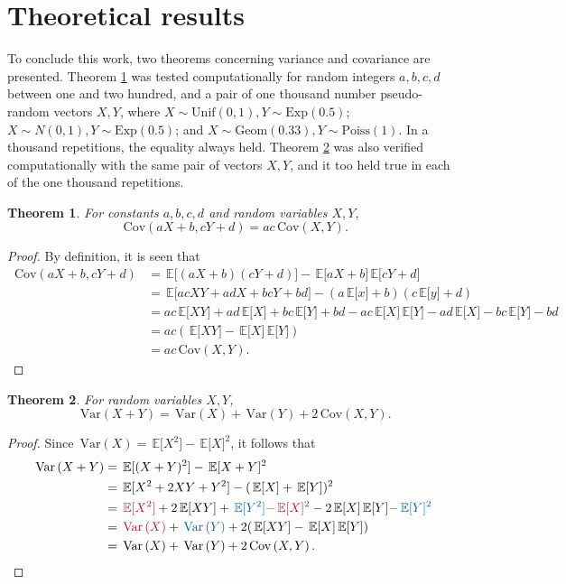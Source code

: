 \documentclass[letterpaper, 10 pt, conference]{article}
\newtheorem{thm}{Theorem}
\newcommand\var[1]{\, \mathrm{Var} \left( #1 \right)}
\newcommand\cov[1]{\, \mathrm{Cov} \left( #1 \right)}
\newcommand\expec[1]{\, \mathbb{E} \lbrack #1 \rbrack}
\begin{document}
\section{Theoretical results}
To conclude this work, two theorems concerning variance and covariance are presented. Theorem \ref{thm:cov} was tested computationally for random integers $a, b, c, d$ between one and two hundred, and a pair of one thousand number pseudo-random vectors $X, Y$, where  $X \sim \mathrm{Unif}(0,1), Y \sim \mathrm{Exp}(0.5)$; $X \sim N(0,1), Y \sim \mathrm{Exp}(0.5)$; and $X \sim \mathrm{Geom}(0.33), Y \sim \mathrm{Poiss}(1)$. In a thousand repetitions, the equality always held. Theorem \ref{thm:var} was also verified computationally with the same pair of vectors $X, Y$, and it too held true in each of the one thousand repetitions.

\begin{thm} \label{thm:cov}
	For constants $a, b, c, d$ and random variables $X, Y,$
	\begin{equation}
		\cov{a X + b, c Y + d} = a c  \cov{X, Y}.
	\end{equation}
\end{thm}
\begin{proof}
	By definition, it is seen that
	\begin{align}
		\cov{a X + b, c Y + d} &= \expec{(aX+b)(cY+d)} - \expec{a X + b} \expec{c Y + d}\\
		&= \expec{ac XY + ad   X + bc   Y + bd} - (a \expec{x} + b)(c \expec{y} + d)\\
		&= ac   \expec{XY} + ad   \expec{X} + bc    \expec{Y} + bd - ac   \expec{X} \expec{Y} - ad   \expec{X} - bc   \expec{Y} - bd\\
		&= ac(\expec{XY} - \expec{X} \expec{Y})\\
		&= ac   \cov{X, Y}.
	\end{align}
\end{proof}

\begin{thm}\label{thm:var}
	For random variables $X, Y$, 
	\begin{equation}
		\var{X+Y} = \var{X} + \var{Y} + 2   \cov{X, Y}.
	\end{equation}
\end{thm}
\begin{proof}
	Since $\var{X} = \expec{X^2} - \expec{X}^2$, it follows that
	\begin{align}
		\var{X+Y} &= \expec{(X+Y)^2} - \expec{X+Y}^2 \\
		&= \expec{X^2 + 2 X Y + Y^2} - (\expec{X} + \expec{Y} )^2 \\
		&= \textcolor{Maroon}{\expec{X^2}} + 2 \expec{XY} + \textcolor{MidnightBlue}{\expec{Y^2} } \textcolor{Maroon}{ - \expec{X}^2} - 2 \expec{X} \expec{Y} \textcolor{MidnightBlue}{ - \expec{Y}^2} \\
		&= \textcolor{Maroon}{\var{X}} + \textcolor{MidnightBlue}{\var{Y}} + 2( \expec{XY} - \expec{X} \expec{Y} ) \\
		&= \var{X} + \var{Y} + 2 \cov{X, Y}	.	
	\end{align}
\end{proof}



\end{document}
